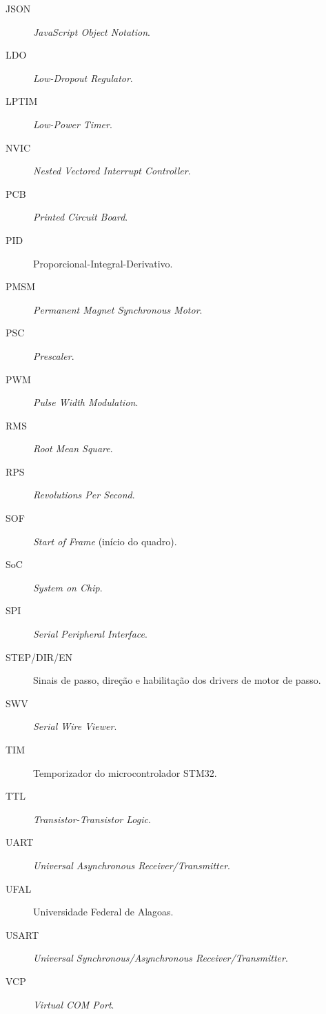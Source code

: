 \begin{description}
  \item[JSON] \quad \emph{JavaScript Object Notation}.
  \item[LDO] \quad \emph{Low-Dropout Regulator}.
  \item[LPTIM] \quad \emph{Low-Power Timer}.
  \item[NVIC] \quad \emph{Nested Vectored Interrupt Controller}.
  \item[PCB] \quad \emph{Printed Circuit Board}.
  \item[PID] \quad Proporcional-Integral-Derivativo.
  \item[PMSM] \quad \emph{Permanent Magnet Synchronous Motor}.
  \item[PSC] \quad \emph{Prescaler}.
  \item[PWM] \quad \emph{Pulse Width Modulation}.
  \item[RMS] \quad \emph{Root Mean Square}.
  \item[RPS] \quad \emph{Revolutions Per Second}.
  \item[SOF] \quad \emph{Start of Frame} (início do quadro).
  \item[SoC] \quad \emph{System on Chip}.
  \item[SPI] \quad \emph{Serial Peripheral Interface}.
  \item[STEP/DIR/EN] \quad Sinais de passo, direção e habilitação dos drivers de motor de passo.
  \item[SWV] \quad \emph{Serial Wire Viewer}.
  \item[TIM] \quad Temporizador do microcontrolador STM32.
  \item[TTL] \quad \emph{Transistor-Transistor Logic}.
  \item[UART] \quad \emph{Universal Asynchronous Receiver/Transmitter}.
  \item[UFAL] \quad Universidade Federal de Alagoas.
  \item[USART] \quad \emph{Universal Synchronous/Asynchronous Receiver/Transmitter}.
  \item[VCP] \quad \emph{Virtual COM Port}.
\end{description}

